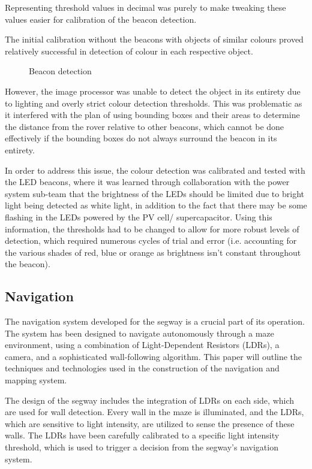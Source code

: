 Representing threshold values in decimal was purely to make tweaking these values easier for calibration of the beacon detection.

The initial calibration without the beacons with objects of similar colours proved relatively successful in detection of colour in each respective object.

\begin{figure}
    \centering
    \caption{Beacon detection}
\end{figure}

However, the image processor was unable to detect the object in its entirety due to lighting and overly strict colour detection thresholds. This was problematic as it interfered with the plan of using bounding boxes and their areas to determine the distance from the rover relative to other beacons, which cannot be done effectively if the bounding boxes do not always surround the beacon in its entirety.

In order to address this issue, the colour detection was calibrated and tested with the LED beacons, where it was learned through collaboration with the power system sub-team that the brightness of the LEDs should be limited due to bright light being detected as white light, in addition to the fact that there may be some flashing in the LEDs powered by the PV cell/ supercapacitor. Using this information, the thresholds had to be changed to allow for more robust levels of detection, which required numerous cycles of trial and error (i.e. accounting for the various shades of red, blue or orange as brightness isn’t constant throughout the beacon).

\subsection{Navigation}

The navigation system developed for the segway is a crucial part of its operation. The system has been designed to navigate autonomously through a maze environment, using a combination of Light-Dependent Resistors (LDRs), a camera, and a sophisticated wall-following algorithm. This paper will outline the techniques and technologies used in the construction of the navigation and mapping system.

The design of the segway includes the integration of LDRs on each side, which are used for wall detection. Every wall in the maze is illuminated, and the LDRs, which are sensitive to light intensity, are utilized to sense the presence of these walls. The LDRs have been carefully calibrated to a specific light intensity threshold, which is used to trigger a decision from the segway's navigation system.

